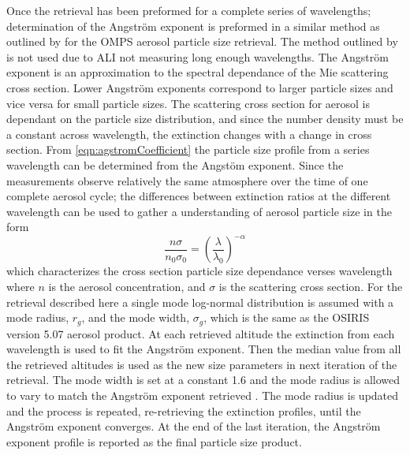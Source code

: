\documentclass[12pt]{article}
\begin{document}
Once the retrieval has been preformed for a complete series of wavelengths; determination of the Angstr\"{o}m exponent is preformed in a similar method as outlined by 
\cite{Rault2013} for the OMPS aerosol particle size retrieval. The method outlined by \cite{Rieger2014} is not used due to ALI not measuring long enough wavelengths. The 
Angstr\"{o}m exponent is an approximation to the spectral dependance of the Mie scattering cross section. Lower Angstr\"{o}m exponents correspond to larger particle sizes and 
vice versa for small particle sizes. The scattering cross section for aerosol is dependant on the particle size distribution, and since the number density must be a constant 
across wavelength, the extinction changes with a change in cross section. From \autoref{eqn:agstromCoefficient} the particle size profile from a series wavelength can be 
determined from the Angst\"{o}m exponent. Since the measurements observe relatively the same atmosphere over the time of one complete aerosol cycle; the differences between 
extinction ratios at the different wavelength can be used to gather a understanding of aerosol particle size in the form
\begin{equation}
    \frac{n\sigma}{n_{0}\sigma_{0}} = \left(\frac{\lambda}{\lambda_{0}}\right)^{-\alpha}
    \label{eqn:agstromCoefficient}
\end{equation}
which characterizes the cross section particle size dependance verses wavelength where $n$ is the aerosol concentration, and $\sigma$ is the scattering cross section. For the 
retrieval described here a single mode log-normal distribution is assumed with a mode radius, $r_{g}$, and the mode width, $\sigma_{g}$, which is the same as the OSIRIS version 
5.07 aerosol product.  At each retrieved altitude the extinction from each wavelength is used to fit the Angstr\"{o}m exponent. Then the median value from all the retrieved 
altitudes is used as the new size parameters in next iteration of the retrieval. The mode width is set at a constant 1.6 and the mode radius is allowed to vary to match the 
Angstr\"{o}m exponent retrieved \citep{Bourassa2008b, Rieger2014}. The mode radius is updated and the process is repeated, re-retrieving the extinction profiles, until the 
Angstr\"{o}m exponent converges. At the end of the last iteration, the Angstr\"{o}m exponent profile is reported as the final particle size product.
\end{document}
